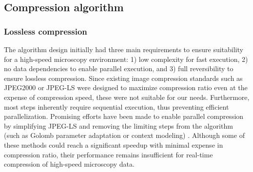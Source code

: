 


    


    

  \subsection{Compression algorithm}


    
    \subsubsection{Lossless compression}
    The algorithm design initially had three main requirements to ensure suitability for a high-speed microscopy environment: 1) low complexity for fast execution, 2) no data dependencies to enable parallel execution, and 3) full reversibility to ensure lossless compression. Since existing image compression standards such as JPEG2000 \cite{adams_jpeg-2000_2001} or JPEG-LS \cite{weinberger_loco-i_2000} were designed to maximize compression ratio even at the expense of compression speed, these were not suitable for our needs. Furthermore, most steps inherently require sequential execution, thus preventing efficient parallelization. Promising efforts have been made to enable parallel compression by simplifying JPEG-LS and removing the limiting steps from the algorithm (such as Golomb parameter adaptation or context modeling) \cite{wang_fast_2012,starosolski_simple_2007}. Although some of these methods could reach a significant speedup with minimal expense in compression ratio, their performance remains insufficient for real-time compression of high-speed microscopy data.

